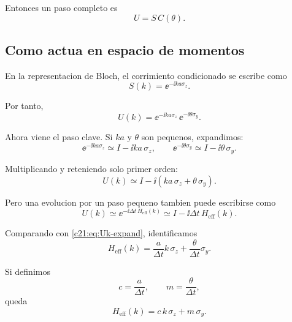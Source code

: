Entonces un paso completo es
\begin{equation}
U = S\,C(\theta).
\label{c21:eq:U-step}
\end{equation}

\subsection{Como actua en espacio de momentos}

En la representacion de Bloch, el corrimiento condicionado se escribe como
\begin{equation}
S(k)=\ee^{-\ii ka \sigma_z}.
\end{equation}

Por tanto,
\begin{equation}
U(k)=\ee^{-\ii ka \sigma_z}\,\ee^{-\ii \theta \sigma_y}.
\label{c21:eq:Uk}
\end{equation}

Ahora viene el paso clave. Si \(ka\) y \(\theta\) son pequenos, expandimos:
\begin{equation}
\ee^{-\ii ka \sigma_z}\simeq I-\ii ka\,\sigma_z,
\qquad
\ee^{-\ii \theta \sigma_y}\simeq I-\ii \theta\,\sigma_y.
\end{equation}

Multiplicando y reteniendo solo primer orden:
\begin{equation}
U(k)\simeq I-\ii\left(ka\,\sigma_z + \theta\,\sigma_y\right).
\label{c21:eq:Uk-expand}
\end{equation}

Pero una evolucion por un paso pequeno tambien puede escribirse como
\begin{equation}
U(k)\simeq \ee^{-\ii \Delta t\, H_{\text{eff}}(k)}
\simeq
I-\ii \Delta t\, H_{\text{eff}}(k).
\end{equation}

Comparando con \eqref{c21:eq:Uk-expand}, identificamos
\begin{equation}
H_{\text{eff}}(k)=\frac{a}{\Delta t}k\,\sigma_z + \frac{\theta}{\Delta t}\sigma_y.
\label{c21:eq:Heff-walk}
\end{equation}

Si definimos
\begin{equation}
c=\frac{a}{\Delta t},
\qquad
m=\frac{\theta}{\Delta t},
\end{equation}
queda
\begin{equation}
H_{\text{eff}}(k)= c\,k\,\sigma_z + m\,\sigma_y.
\end{equation}

